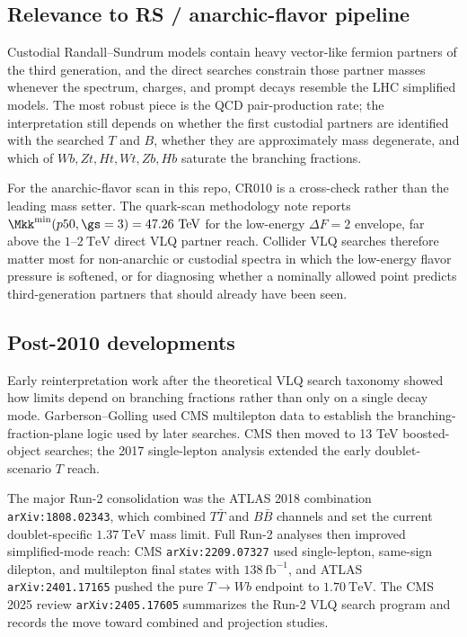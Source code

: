 \subsection*{Relevance to RS / anarchic-flavor pipeline}
Custodial Randall--Sundrum models contain heavy vector-like fermion partners
of the third generation, and the direct searches constrain those partner
masses whenever the spectrum, charges, and prompt decays resemble the LHC
simplified models.  The most robust piece is the QCD pair-production rate;
the interpretation still depends on whether the first custodial partners are
identified with the searched \(T\) and \(B\), whether they are approximately
mass degenerate, and which of \(Wb,Zt,Ht,Wt,Zb,Hb\) saturate the branching
fractions.

For the anarchic-flavor scan in this repo, CR010 is a cross-check rather than
the leading mass setter.  The quark-scan methodology note reports
\(\Mkk^{\min}(p50,\gs=3)=47.26~\mathrm{TeV}\) for the low-energy
\(\Delta F=2\) envelope, far above the \(1\)--\(2~\mathrm{TeV}\) direct VLQ
partner reach.  Collider VLQ searches therefore matter most for non-anarchic
or custodial spectra in which the low-energy flavor pressure is softened, or
for diagnosing whether a nominally allowed point predicts third-generation
partners that should already have been seen.

\subsection*{Post-2010 developments}
Early reinterpretation work after the theoretical VLQ search taxonomy showed
how limits depend on branching fractions rather than only on a single decay
mode.  Garberson--Golling used CMS multilepton data to establish the
branching-fraction-plane logic used by later searches.  CMS then moved to
13 TeV boosted-object searches; the 2017 single-lepton analysis extended the
early doublet-scenario \(T\) reach.

The major Run-2 consolidation was the ATLAS 2018 combination
\texttt{arXiv:1808.02343}, which combined \(T\bar T\) and \(B\bar B\) channels
and set the current doublet-specific \(1.37~\mathrm{TeV}\) mass limit.  Full
Run-2 analyses then improved simplified-mode reach: CMS
\texttt{arXiv:2209.07327} used single-lepton, same-sign dilepton, and
multilepton final states with \(138~\mathrm{fb}^{-1}\), and ATLAS
\texttt{arXiv:2401.17165} pushed the pure \(T\to Wb\) endpoint to
\(1.70~\mathrm{TeV}\).  The CMS 2025 review \texttt{arXiv:2405.17605}
summarizes the Run-2 VLQ search program and records the move toward combined
and projection studies.

